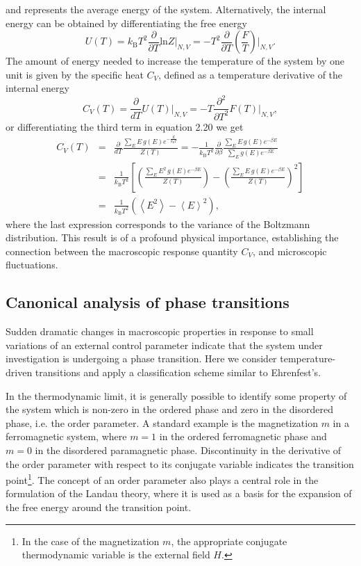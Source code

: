 \documentclass[12pt]{report}
\begin{document}
and represents the average energy of the system. Alternatively, the internal energy can be obtained by differentiating the free energy
\begin{equation}
U(T) = k_{\mathrm{B}}T^{2}\frac{\partial}{\partial T} \mathrm{ln} Z\bigg|_{N,V}
= -T^{2}\frac{\partial}{\partial T}\left(\frac{F}{T}\right)\bigg|_{N,V}.
\end{equation}
The amount of energy needed to increase the temperature of the system by one unit is given by the specific heat 
$C_{V}$, defined as a temperature derivative of the internal energy
\begin{equation}\label{eq:22}
C_{V}(T) = \frac{\partial}{dT}U(T)\bigg|_{N,V} = -T\frac{\partial^{2}}{\partial T^{2}}F(T)\bigg|_{N,V},
\end{equation}
or differentiating the third term in equation 2.20 we get
\begin{eqnarray}
C_{V}(T) &=&  \frac{\partial}{dT}\frac{\sum_{E} E \, g(E) e^{-\frac{E}{k_{\mathrm{B}}T}}}{Z(T)} = -\frac{1}{k_{\mathrm{B}}T^2}\frac{\partial}{\partial \beta}\frac{\sum_{E} E \, g(E) e^{-\beta E}}{\sum_{E}g(E) e^{-\beta E}} \nonumber \\
&=& \frac{1}{k_{\mathrm{B}}T^2} \left[\left(\frac{\sum_{E} E^{2} \, g(E)  e^{-\beta E}}{Z(T)}\right) - \left(\frac{\sum_{E} E \, g(E)  e^{-\beta E}}{Z(T)}\right)^{2}\right] \nonumber \\
&=& \frac{1}{k_{\mathrm{B}}T^2}\left(\left<E^{2}\right> - \left<E\right>^{2}\right),
\end{eqnarray}
where the last expression corresponds to the variance of the Boltzmann distribution. This result is of a profound physical importance, establishing the connection between the macroscopic response quantity $C_{V}$, and microscopic fluctuations.

\subsection{Canonical analysis of phase transitions} 
Sudden dramatic changes in macroscopic properties in response to small variations of an external control parameter indicate that the system under investigation is undergoing a phase transition. Here we consider temperature-driven transitions and apply a classification scheme similar to Ehrenfest's.

In the thermodynamic limit, it is generally possible to identify some property of the system which is non-zero in the ordered phase and zero in the disordered phase, i.e. the order parameter. A standard example is the magnetization $m$ in a ferromagnetic system, where $m = 1$ in the ordered ferromagnetic phase and $m = 0$ in the disordered paramagnetic phase. Discontinuity in the derivative of the order parameter with respect to its conjugate variable indicates the transition point\footnote{In the case of the magnetization $m$, the appropriate conjugate thermodynamic variable is the external field $H$.}. The concept of an order parameter also plays a central role in the formulation of the Landau theory, where it is used as a basis for the expansion of the free energy around the transition point.
\end{document}
